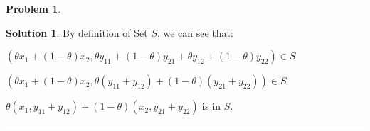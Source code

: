 \documentclass{article}
\theoremstyle{definition}
\newtheorem{problem}{Problem}
\def\fline{\rule{0.75\linewidth}{0.5pt}}
\newcommand{\finishline}{\begin{center}\fline\end{center}}
\newtheorem*{solution*}{Solution}
\newenvironment{solution}{\begin{solution*}}{{\finishline} \end{solution*}}
\begin{document}
\begin{problem}
\begin{solution}
    By definition of Set $S$, we can see that: \newline 

    $ (\theta x_1 + (1 - \theta) x_2, \theta y_{11} + (1 - \theta) y_{21} + \theta y_{12} + (1 - \theta) y_{22} ) \in S$ \newline 

        $ (\theta x_1 + (1 - \theta) x_2, \theta (y_{11} + y_{12}) + (1 - \theta) (y_{21} + y_{22}) ) \in S$ \newline 

$\theta (x_1, y_{11} + y_{12}) + (1 - \theta) (x_2, y_{21} + y_{22})$ is in $S$.  
    
        
    \end{solution}
\end{problem}
\end{document}
